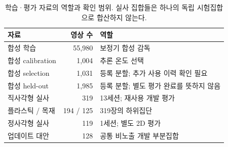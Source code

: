 \begin{table}[t]
\centering\footnotesize
\setlength{\tabcolsep}{4pt}
\caption{학습·평가 자료의 역할과 확인 범위. 실사 집합들은 하나의 독립 시험집합으로 합산하지 않는다.}\label{tab:data}
\begin{tabularx}{\columnwidth}{p{}rY}
\toprule
자료 & 영상 수 & 역할 \\
\midrule
합성 학습 & 55,980 & 보정기 합성 감독 \\
합성 calibration & 1,004 & 추론 온도 선택 \\
합성 selection & 1,031 & 등록 분할; 추가 사용 이력 확인 필요 \\
합성 held-out & 1,985 & 등록 분할; 별도 평가 완료를 뜻하지 않음 \\
\midrule
직사각형 실사 & 319 & 13세션; 재사용 개발 평가 \\
플라스틱 / 목재 & 194 / 125 & 319장의 하위집단 \\
정사각형 실사 & 119 & 1세션; 별도 2D 평가 \\
업데이트 대안 & 128 & 공통 비노출 개발 부분집합 \\
\bottomrule
\end{tabularx}
\end{table}
